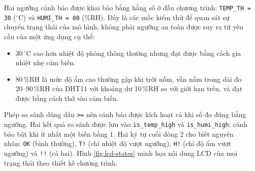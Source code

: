 Hai ngưỡng cảnh báo được khai báo bằng hằng số ở đầu chương trình: \texttt{TEMP\_TH = 30} ($^\circ$C) và \texttt{HUMI\_TH = 80} (\%RH). Đây là các mốc kiểm thử để quan sát sự chuyển trạng thái của mô hình, không phải ngưỡng an toàn được suy ra từ yêu cầu của một ứng dụng cụ thể:
\begin{itemize}[leftmargin=1.2cm]
    \item 30\,$^\circ$C cao hơn nhiệt độ phòng thông thường nhưng đạt được bằng cách gia nhiệt nhẹ cảm biến.
    \item 80\,\%RH là mức độ ẩm cao thường gặp khi trời nồm, vẫn nằm trong dải đo 20--90\,\%RH của DHT11 với khoảng dư 10\,\%RH so với giới hạn trên, và đạt được bằng cách thở vào cảm biến.
\end{itemize}
Phép so sánh dùng dấu \texttt{>=} nên cảnh báo được kích hoạt cả khi số đo đúng bằng ngưỡng. Hai kết quả so sánh được lưu vào \texttt{is\_temp\_high} và \texttt{is\_humi\_high}; cảnh báo bật khi ít nhất một biến bằng 1. Hai ký tự cuối dòng 2 cho biết nguyên nhân: \texttt{OK} (bình thường), \texttt{T!} (chỉ nhiệt độ vượt ngưỡng), \texttt{H!} (chỉ độ ẩm vượt ngưỡng) và \texttt{!!} (cả hai). Hình \ref{fig:lcd-states} minh họa nội dung LCD của mọi trạng thái theo thiết kế chương trình.

